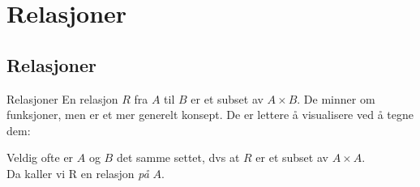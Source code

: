 \section{Relasjoner}
\subsection{Relasjoner}
\begin{frame}[fragile]{Relasjoner}
    En relasjon $R$ fra $A$ til $B$ er et subset av $A \times B$. De minner om funksjoner, men er et mer generelt konsept. De er lettere å visualisere ved å tegne dem:
    \begin{figure}
        \centering
        \qquad
        \qquad
        \qquad
        \label{fig:relasjoner}
    \end{figure} 

    \pause
    Veldig ofte er $A$ og $B$ det samme settet, dvs at $R$ er et subset av $A \times A$.\\ 
    Da kaller vi R en relasjon \emph{på} $A$.
\end{frame}

